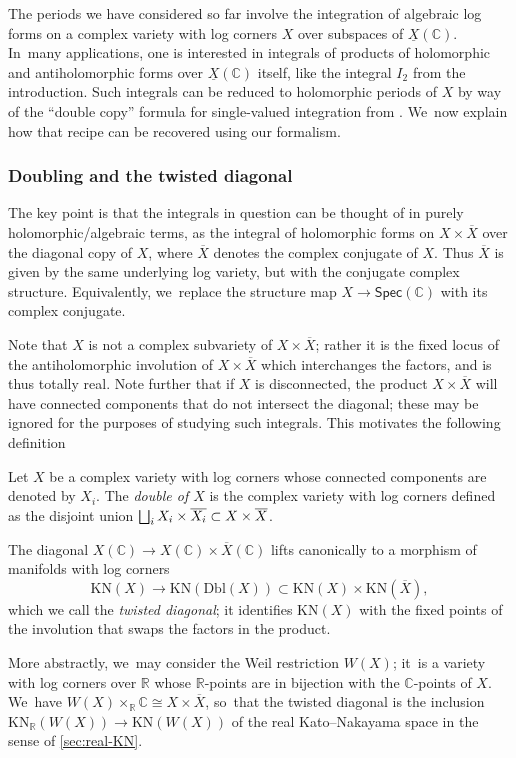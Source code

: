 \documentclass[10pt]{amsart}
\let\oldbigsqcup\bigsqcup
\renewcommand{\bigsqcup}{\mathop{\textstyle\oldbigsqcup}\displaylimits}
\theoremstyle{definition}
\theoremstyle{remark}
\newenvironment{remark}
  {\pushQED{\qed}\renewcommand{\qedsymbol}{$\lozenge$}\remarkx}
  {\popQED\endremarkx}
\let\defn\emph
\newcommand{\CC}{\mathbb{C}}
\newcommand{\RR}{\mathbb{R}}
\newcommand{\rbrac}[1]{\left(#1\right)}
\newcommand{\cX}{\overline{X}}
\newcommand{\uX}{\underline{X}}
\newcommand{\KN}[1]{\mathrm{KN}(#1)}
\newcommand{\KNR}[1]{\mathrm{KN}_\RR\rbrac{#1}}
\newcommand{\Spec}[1]{\mathsf{Spec}(#1)}
\newcommand{\Dbl}[1]{\mathrm{Dbl}(#1)}
\begin{document}
The periods we have considered so far involve the integration of algebraic log forms on a complex variety with log corners $X$ over subspaces of $\uX(\CC)$. In~many applications, one is interested in integrals of products of holomorphic and antiholomorphic forms over $\uX(\CC)$ itself, like the integral $I_2$ from the introduction. Such integrals can be reduced to holomorphic periods of $X$ by way of the ``double copy'' formula for single-valued integration from \cite{BrownDupont}. We~now explain how that recipe can be recovered using our formalism.

\subsubsection{Doubling and the twisted diagonal}
The key point is that the integrals in question can be thought of in purely holomorphic/algebraic terms, as the integral of holomorphic forms on $X \times \overline{X}$ over the diagonal copy of $X$, where $\overline{X}$ denotes the complex conjugate of $X$. Thus $\overline{X}$ is given by the same underlying log variety, but with the conjugate complex structure. Equivalently, we~replace the structure map $X \to \Spec{\CC}$ with its complex conjugate.

Note that $X$ is not a complex subvariety of $X \times \cX$; rather it is the fixed locus of the antiholomorphic involution of $X \times \overline{X}$ which interchanges the factors, and is thus totally real. Note further that if $X$ is disconnected, the product $X \times\overline{X}$ will have connected components that do not intersect the diagonal; these may be ignored for the purposes of studying such integrals. This motivates the following definition
\begin{definition}
Let $X$ be a complex variety with log corners whose connected components are denoted by $X_i$. The \defn{double of $X$} is the complex variety with log corners defined as the disjoint union $\bigsqcup_i X_i\times \overline{X_i} \subset X\times\cX$.
\end{definition}

The diagonal $X(\CC) \to X(\CC) \times \cX(\CC)$ lifts canonically to a morphism of manifolds with log corners
\[
\KN{X} \to \KN{\Dbl{X}} \subset \KN{X} \times \KN{\cX},
\]
which we call the \defn{twisted diagonal}; it identifies $\KN{X}$ with the fixed points of the involution that swaps the factors in the product.

\begin{remark}
More abstractly, we~may consider the Weil restriction $W(X)$; it~is a variety with log corners over $\RR$ whose $\RR$-points are in bijection with the $\CC$-points of $X$. We~have $W(X)\times_\RR\CC \cong X \times \cX$, so~that the twisted diagonal is the inclusion $\KNR{W(X)} \to \KN{W(X)}$ of the real Kato--Nakayama space in the sense of \autoref{sec:real-KN}.
\end{remark}
\end{document}
